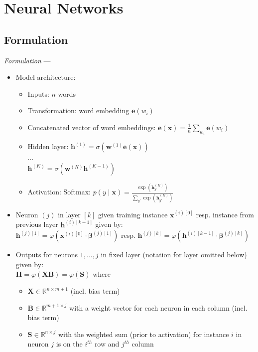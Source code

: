 \section{Neural Networks}
\subsection*{Formulation}
\emph{Formulation} --- 
\begin{itemize}
    \item Model architecture: 
    \begin{itemize}
        \item Inputs: $n$ words
        \item Transformation: word embedding $\boldsymbol{e}(w_i)$
        \item Concatenated vector of word embeddings:
        $
        \boldsymbol{e}(\boldsymbol{x}) = \frac{1}{n} \sum_{w_i} \boldsymbol{e}(w_i)
        $
        \item Hidden layer:
        $
        \boldsymbol{h}^{(1)} = \sigma(\boldsymbol{w}^{(1)}\boldsymbol{e}(\boldsymbol{x}))
        $\\...\\
        $
        \boldsymbol{h}^{(K)} = \sigma(\boldsymbol{w}^{(K)}\boldsymbol{h}^{(K-1)})
        $
        \item Activation: Softmax:
        $
        p(y \mid \boldsymbol{x}) = \frac{\exp \left( \boldsymbol{h}_y^{(K)} \right)}{\sum_{y'} \exp \left( \boldsymbol{h}_{y'}^{(K)} \right)}
        $
    \end{itemize}
\end{itemize}
\begin{itemize}
    \item Neuron $(j)$ in layer $[k]$ given training instance $\boldsymbol{x}^{(i)[0]}$ resp. instance from previous layer $\boldsymbol{h}^{(i)[k-1]}$ given by:\\
    $\boldsymbol{h}^{(j)[1]} = \varphi( \boldsymbol{x}^{(i)[0]} \cdot \boldsymbol{\beta}^{(j)[1]} )$ resp. $\boldsymbol{h}^{(j)[k]} = \varphi( \boldsymbol{h}^{(i)[k-1]} \cdot \boldsymbol{\beta}^{(j)[k]} )$ 
    \item Outputs for neurons $1, ..., j$ in fixed layer (notation for layer omitted below) given by:\\
    $\boldsymbol{H} = \varphi ( \boldsymbol{X} \boldsymbol{B} ) = \varphi ( \boldsymbol{S} )$ where
    \begin{itemize}
        \item $\boldsymbol{X} \in \mathbb{R}^{n \times m+1}$ (incl. bias term)
        \item $\boldsymbol{B} \in \mathbb{R}^{m+1 \times j}$ with a weight vector for each neuron in each column (incl. bias term)
        \item $\boldsymbol{S} \in \mathbb{R}^{n \times j}$ with the weighted sum (prior to activation) for instance $i$ in neuron $j$ is on the $i^{th}$ row and $j^{th}$ column
    \end{itemize}
\end{itemize}

